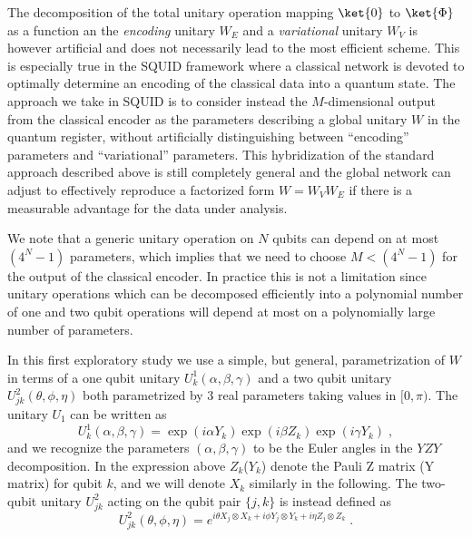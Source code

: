 The decomposition of the total unitary operation mapping $\ket{0}$ to $\ket{\Phi}$ as a function an the {\it encoding} unitary $W_E$ and a {\it variational} unitary  $W_V$ is however artificial and does not necessarily lead to the most efficient scheme. This is especially true in the SQUID framework where a classical network is devoted to optimally determine an encoding of the classical data into a quantum state. The approach we take in SQUID is to consider instead the $M$-dimensional output from the classical encoder as the parameters describing a global unitary $W$ in the quantum register, without artificially distinguishing between ``encoding'' parameters and ``variational'' parameters. This hybridization of the standard approach described above is still completely general and the global network can adjust to effectively reproduce a factorized form $W=W_VW_E$ if there is a measurable advantage for the data under analysis.

We note that a generic unitary operation on $N$ qubits can depend on at most $(4^N-1)$ parameters, which implies that we need to choose $M<(4^N-1)$ for the output of the classical encoder. In practice this is not a limitation since unitary operations which can be decomposed efficiently into a polynomial number of one and two qubit operations will depend at most on a polynomially large number of parameters.

In this first exploratory study we use a simple, but general, parametrization of $W$ in terms of a one qubit unitary $U^1_{k}(\alpha,\beta,\gamma)$ and a two qubit unitary $U^2_{jk}(\theta,\phi,\eta)$ both parametrized by 3 real parameters taking values in $[0,\pi)$.
The unitary $U_1$ can be written as
\begin{equation}
\label{eq:u1_unitary}
U^1_k(\alpha,\beta,\gamma) = \exp\left(i\alpha Y_k\right)\exp\left(i\beta Z_k\right)\exp\left(i\gamma Y_k\right)\;,
\end{equation}
and we recognize the parameters $(\alpha,\beta,\gamma)$ to be the Euler angles in the $YZY$ decomposition.
In the expression above $Z_k$($Y_k$) denote the Pauli Z matrix (Y matrix) for qubit $k$, and we will denote $X_k$ similarly in the following.
The two-qubit unitary $U^2_{jk}$ acting on the qubit pair $\{j,k\}$ is instead defined as
\begin{equation}
\label{eq:u2_unitary}
U^2_{jk}(\theta,\phi,\eta) =e^{i\theta X_j\otimes X_k + i\phi Y_j\otimes Y_k + i\eta Z_j\otimes Z_k}\;.
\end{equation}

